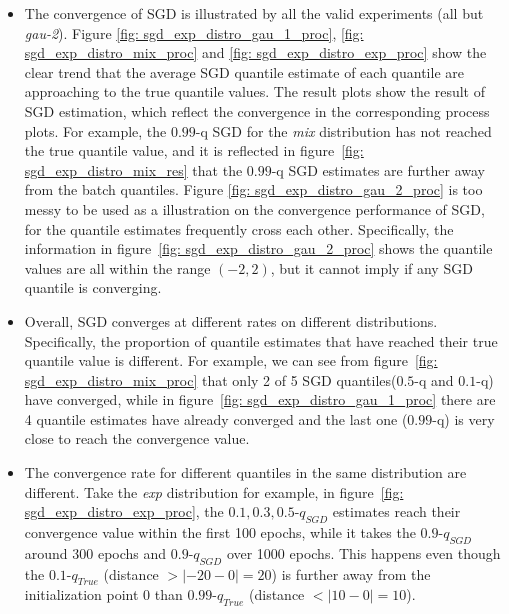 \begin{itemize}
    \item  The convergence of SGD is illustrated by all the valid experiments (all but \textit{gau-2}). Figure \ref{fig: sgd_exp_distro_gau_1_proc}, \ref{fig: sgd_exp_distro_mix_proc} and \ref{fig: sgd_exp_distro_exp_proc} show the clear trend that the average SGD quantile estimate of each quantile are approaching to the true quantile values. 
    The result plots show the result of SGD estimation, which reflect the convergence in the corresponding process plots. For example, the $0.99$-q SGD for the \textit{mix} distribution has not reached the true quantile value, and it is reflected in figure~\ref{fig: sgd_exp_distro_mix_res} that the $0.99$-q SGD estimates are further away from the batch quantiles.
    Figure \ref{fig: sgd_exp_distro_gau_2_proc} is too messy to be used as a illustration on the convergence performance of SGD, for the quantile estimates frequently cross each other. Specifically, the information in figure~\ref{fig: sgd_exp_distro_gau_2_proc} shows the quantile values are all within the range $(-2, 2)$, but it cannot imply if any SGD quantile is converging.
    
    \item Overall, SGD converges at different rates on different distributions. Specifically, the proportion of quantile estimates that have reached their true quantile value is different. For example, we can see from figure~\ref{fig: sgd_exp_distro_mix_proc} that only 2 of 5 SGD quantiles($0.5$-q and $0.1$-q) have converged, while in figure~\ref{fig: sgd_exp_distro_gau_1_proc} there are 4 quantile estimates have already converged and the last one ($0.99$-q) is very close to reach the convergence value.
    
    \item The convergence rate for different quantiles in the same distribution are different. Take the \textit{exp} distribution for example, in figure~\ref{fig: sgd_exp_distro_exp_proc}, the $0.1, 0.3, 0.5$-$q_{SGD}$ estimates reach their convergence value within the first 100 epochs, while it takes the $0.9$-$q_{SGD}$ around 300 epochs and $0.9$-$q_{SGD}$ over 1000 epochs. This happens even though the $0.1$-$q_{True}$ (distance $> |-20-0| = 20$) is further away from the initialization point $0$ than $0.99$-$q_{True}$ (distance $< |10-0| = 10$).
    

\end{itemize}

